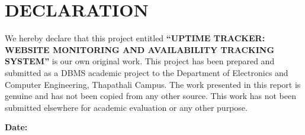 \chapter*{DECLARATION}
{}

\begin{sloppypar}
We hereby declare that this project entitled \textbf{``UPTIME TRACKER: WEBSITE MONITORING AND AVAILABILITY TRACKING SYSTEM''} is our own original work. This project has been prepared and submitted as a DBMS academic project to the Department of Electronics and Computer Engineering, Thapathali Campus. The work presented in this report is genuine and has not been copied from any other source. This work has not been submitted elsewhere for academic evaluation or any other purpose.
\end{sloppypar}
\vspace{0.5cm}

\noindent \authorTable

\vspace{0.5cm}

\noindent \textbf{Date:} \cDate
